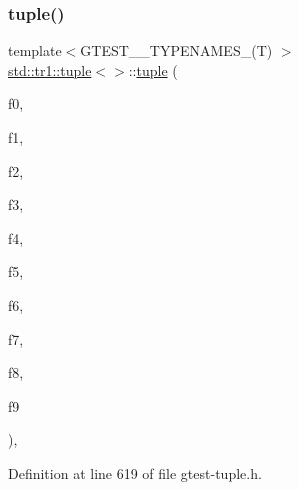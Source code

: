 \subsubsection{\texorpdfstring{tuple()}{tuple()}\hspace{0.1cm}{\footnotesize\ttfamily [2/4]}}
{\footnotesize\ttfamily template$<$G\+T\+E\+S\+T\+\_\+\_\+\+T\+Y\+P\+E\+N\+A\+M\+E\+S\+\_\+(\+T) $>$ \\
\hyperlink{classstd_1_1tr1_1_1tuple}{std\+::tr1\+::tuple}$<$$>$\+::\hyperlink{classstd_1_1tr1_1_1tuple}{tuple} (\begin{DoxyParamCaption}\item[{\hyperlink{namespacestd_1_1tr1_ae7b5ea477ac34a3eef5c4c15c42b76ed}{G\+T\+E\+S\+T\+\_\+\+B\+Y\+\_\+\+R\+E\+F\+\_\+}(T0)}]{f0,  }\item[{\hyperlink{namespacestd_1_1tr1_ae7b5ea477ac34a3eef5c4c15c42b76ed}{G\+T\+E\+S\+T\+\_\+\+B\+Y\+\_\+\+R\+E\+F\+\_\+}(T1)}]{f1,  }\item[{\hyperlink{namespacestd_1_1tr1_ae7b5ea477ac34a3eef5c4c15c42b76ed}{G\+T\+E\+S\+T\+\_\+\+B\+Y\+\_\+\+R\+E\+F\+\_\+}(T2)}]{f2,  }\item[{\hyperlink{namespacestd_1_1tr1_ae7b5ea477ac34a3eef5c4c15c42b76ed}{G\+T\+E\+S\+T\+\_\+\+B\+Y\+\_\+\+R\+E\+F\+\_\+}(T3)}]{f3,  }\item[{\hyperlink{namespacestd_1_1tr1_ae7b5ea477ac34a3eef5c4c15c42b76ed}{G\+T\+E\+S\+T\+\_\+\+B\+Y\+\_\+\+R\+E\+F\+\_\+}(T4)}]{f4,  }\item[{\hyperlink{namespacestd_1_1tr1_ae7b5ea477ac34a3eef5c4c15c42b76ed}{G\+T\+E\+S\+T\+\_\+\+B\+Y\+\_\+\+R\+E\+F\+\_\+}(T5)}]{f5,  }\item[{\hyperlink{namespacestd_1_1tr1_ae7b5ea477ac34a3eef5c4c15c42b76ed}{G\+T\+E\+S\+T\+\_\+\+B\+Y\+\_\+\+R\+E\+F\+\_\+}(T6)}]{f6,  }\item[{\hyperlink{namespacestd_1_1tr1_ae7b5ea477ac34a3eef5c4c15c42b76ed}{G\+T\+E\+S\+T\+\_\+\+B\+Y\+\_\+\+R\+E\+F\+\_\+}(T7)}]{f7,  }\item[{\hyperlink{namespacestd_1_1tr1_ae7b5ea477ac34a3eef5c4c15c42b76ed}{G\+T\+E\+S\+T\+\_\+\+B\+Y\+\_\+\+R\+E\+F\+\_\+}(T8)}]{f8,  }\item[{\hyperlink{namespacestd_1_1tr1_ae7b5ea477ac34a3eef5c4c15c42b76ed}{G\+T\+E\+S\+T\+\_\+\+B\+Y\+\_\+\+R\+E\+F\+\_\+}(T9)}]{f9 }\end{DoxyParamCaption})\hspace{0.3cm}{\ttfamily [inline]}, {\ttfamily [explicit]}}



Definition at line 619 of file gtest-\/tuple.\+h.


